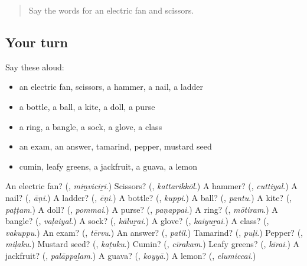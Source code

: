 \label{lesson:TA-R139-second-pass-nature-and-animals}



\begin{quote}
Say the words for an electric fan and scissors.
\end{quote}

\subsection*{Your turn}
Say these aloud:

\begin{itemize}
\raggedright
  \item an electric fan, scissors, a hammer, a nail, a ladder
  \item a bottle, a ball, a kite, a doll, a purse
  \item a ring, a bangle, a sock, a glove, a class
  \item an exam, an answer, tamarind, pepper, mustard seed
  \item cumin, leafy greens, a jackfruit, a guava, a lemon
\end{itemize}

\begin{tcolorbox}[breakable,colback=teal!4,colframe=teal!35!black,title={Before you move on}]
An electric fan? (\textbf{}, \emph{miṉviciṟi}.) Scissors? (\textbf{}, \emph{kattarikkōl}.) A hammer? (\textbf{}, \emph{cuttiyal}.) A nail? (\textbf{}, \emph{āṇi}.) A ladder? (\textbf{}, \emph{ēṇi}.) A bottle? (\textbf{}, \emph{kuppi}.) A ball? (\textbf{}, \emph{pantu}.) A kite? (\textbf{}, \emph{paṭṭam}.) A doll? (\textbf{}, \emph{pommai}.) A purse? (\textbf{}, \emph{paṇappai}.) A ring? (\textbf{}, \emph{mōtiram}.) A bangle? (\textbf{}, \emph{vaḷaiyal}.) A sock? (\textbf{}, \emph{kāluṟai}.) A glove? (\textbf{}, \emph{kaiyuṟai}.) A class? (\textbf{}, \emph{vakuppu}.) An exam? (\textbf{}, \emph{tērvu}.) An answer? (\textbf{}, \emph{patil}.) Tamarind? (\textbf{}, \emph{puḷi}.) Pepper? (\textbf{}, \emph{miḷaku}.) Mustard seed? (\textbf{}, \emph{kaṭuku}.) Cumin? (\textbf{}, \emph{cīrakam}.) Leafy greens? (\textbf{}, \emph{kīrai}.) A jackfruit? (\textbf{}, \emph{palāppaḻam}.) A guava? (\textbf{}, \emph{koyyā}.) A lemon? (\textbf{}, \emph{elumiccai}.)
\end{tcolorbox}
